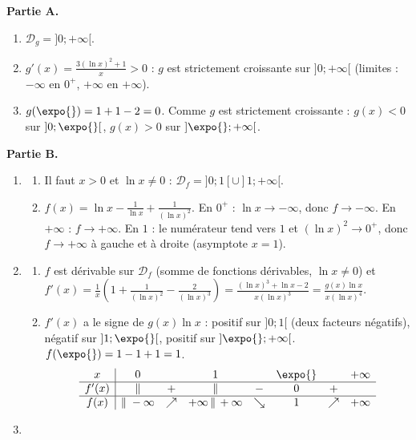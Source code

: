 \begin{corrige}
\begin{sol}
\textbf{Partie A.}
\begin{enumerate}
\item $\mathcal{D}_g = ]0;+\infty[$.
\item $g'(x) = \frac{3(\ln x)^2 + 1}{x} > 0$ : $g$ est strictement croissante sur $]0;+\infty[$
      (limites : $-\infty$ en $0^+$, $+\infty$ en $+\infty$).
\item $g(\expo{}) = 1 + 1 - 2 = 0$. Comme $g$ est strictement croissante : $g(x) < 0$ sur $]0;\expo{}[$, $g(x) > 0$ sur $]\expo{};+\infty[$.
\end{enumerate}
\textbf{Partie B.}
\begin{enumerate}
\item \begin{enumerate}
      \item Il faut $x > 0$ et $\ln x \neq 0$ : $\mathcal{D}_f = ]0;1[ \cup ]1;+\infty[$.
      \item $f(x) = \ln x - \frac{1}{\ln x} + \frac{1}{(\ln x)^2}$.
            En $0^+$ : $\ln x \to -\infty$, donc $f \to -\infty$. En $+\infty$ : $f \to +\infty$.
            En $1$ : le num\'erateur tend vers $1$ et $(\ln x)^2 \to 0^+$, donc $f \to +\infty$ \`a gauche et \`a droite (asymptote $x = 1$).
      \end{enumerate}
\item \begin{enumerate}
      \item $f$ est d\'erivable sur $\mathcal{D}_f$ (somme de fonctions d\'erivables, $\ln x \neq 0$) et
            $f'(x) = \frac{1}{x}\left(1 + \frac{1}{(\ln x)^2} - \frac{2}{(\ln x)^3}\right) = \frac{(\ln x)^3 + \ln x - 2}{x(\ln x)^3} = \frac{g(x)\ln x}{x(\ln x)^4}$.
      \item $f'(x)$ a le signe de $g(x)\ln x$ : positif sur $]0;1[$ (deux facteurs n\'egatifs), n\'egatif sur $]1;\expo{}[$, positif sur $]\expo{};+\infty[$.
            $f(\expo{}) = 1 - 1 + 1 = 1$.
            \[
            \begin{array}{c|ccccccc}
            x & 0 & & 1 & & \expo{} & & +\infty \\ \hline
            f'(x) & \| & + & \| & - & 0 & + & \\ \hline
            f(x) & \| \; -\infty & \nearrow & +\infty \, \| \, +\infty & \searrow & 1 & \nearrow & +\infty
            \end{array}
            \]
      \end{enumerate}
\item \begin{enumerate}

\end{enumerate}
\end{enumerate}
\end{sol}
\end{corrige}
